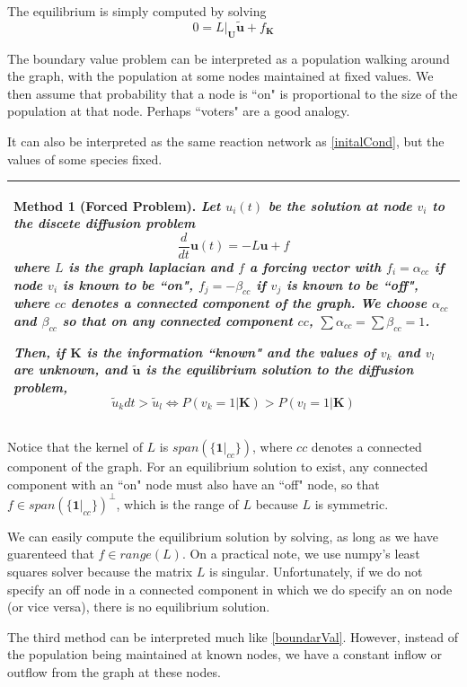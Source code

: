 \documentclass[10pt]{article}
\newtheorem{method}{Method}
\theoremstyle{definition}
\numberwithin{theorem}{section}
\numberwithin{definition}{section}
\numberwithin{lemma}{section}
\numberwithin{corollary}{section}
\numberwithin{clm}{section}
\numberwithin{rmk}{section}
\newenvironment{inbox2}
{\begin{center}
		\begin{tabular}{|p{0.9\textwidth}|}
			\hline \vspace{-0.5 cm}
		}
		{ 
			\\ \hline
		\end{tabular} 
	\end{center}
}
\renewcommand{\b}{\bm}
\begin{document}
The equilibrium is simply computed by solving 
\[
0 = L|_{\b{U}}\b{\tilde{u}} + f_{\b{K}}
\]

The boundary value problem can be interpreted as a population walking around the graph, with the population at some nodes maintained at fixed values. We then assume that probability that a node is ``on" is proportional to the size of the population at that node. Perhaps ``voters" are a good analogy. 

It can also be interpreted as the same reaction network as \cref{initalCond}, but the values of some species fixed.

\begin{inbox2}
\begin{method}[Forced Problem]\label{forcing}
Let $u_i(t)$ be the solution at node $v_i$ to the discete diffusion problem
\[
\frac{d}{dt}\b{u}(t)  = - L\b{u} + f
\]
where $L$ is the  graph laplacian and $f$ a forcing vector with $f_i = \alpha_{cc}$ if node $v_i$ is known to be ``on", $f_j = -\beta_{cc}$ if $v_j$ is known to be ``off", where $cc$ denotes a connected component of the graph. We choose $\alpha_{cc}$ and $\beta_{cc}$ so that on any connected component $cc$, $\sum \alpha_{cc}= \sum \beta_{cc}= 1$. 

Then, if $\b{K}$ is the information ``known" and the values of $v_{k}$ and $v_{l}$ are unknown, and $\b{\tilde{u}}$ is the equilibrium solution to the diffusion problem,
\[
\tilde{u}_k dt >  \tilde{u}_l \Leftrightarrow  P(v_k=  1|\b{K}) > P(v_l = 1|\b{K})
\]
\end{method}
\end{inbox2}

Notice that the kernel of $L$ is $\mathit{span}(\{\b{1}|_{cc}\})$, where $cc$ denotes a connected component of the graph. For an equilibrium solution to exist, any connected component with an ``on" node must also have an ``off" node, so that $f \in \mathit{span}(\{\b{1}|_{cc}\})^{\perp}$, which is the range of $L$ because $L$ is symmetric. 

We can easily compute the equilibrium solution by solving, as long as we have guarenteed that $f \in \mathit{range}(L)$. On a practical note, we use numpy's least squares solver because the matrix $L$ is singular. Unfortunately, if we do not specify an off node in a connected component in which we do specify an on node (or vice versa), there is no equilibrium solution.

The third method can be interpreted much like \cref{boundarVal}. However, instead of the population being maintained at known nodes, we have a constant inflow or outflow from the graph at these nodes. 
\end{document}
